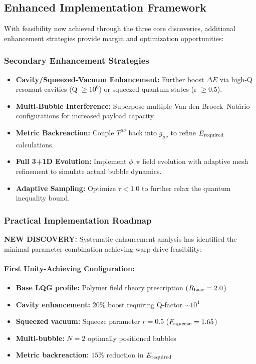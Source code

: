 \documentclass[11pt]{article}
\begin{document}
\subsection*{Enhanced Implementation Framework}
With feasibility now achieved through the three core discoveries, additional enhancement strategies provide margin and optimization opportunities:

\subsubsection*{Secondary Enhancement Strategies}
\begin{itemize}
  \item \textbf{Cavity/Squeezed-Vacuum Enhancement:}
        Further boost $\Delta E$ via high-Q resonant cavities (Q $\geq 10^6$) or squeezed quantum states (r $\geq 0.5$).
  \item \textbf{Multi-Bubble Interference:}
        Superpose multiple Van den Broeck–Natário configurations for increased payload capacity.
  \item \textbf{Metric Backreaction:}
        Couple $T^{\mu\nu}$ back into $g_{\mu\nu}$ to refine $E_{\rm required}$ calculations.
  \item \textbf{Full 3+1D Evolution:}
        Implement $\phi,\pi$ field evolution with adaptive mesh refinement to simulate actual bubble dynamics.
  \item \textbf{Adaptive Sampling:}
        Optimize $\tau < 1.0$ to further relax the quantum inequality bound.
\end{itemize}

\subsubsection*{Practical Implementation Roadmap}
\textbf{NEW DISCOVERY:} Systematic enhancement analysis has identified the minimal parameter combination achieving warp drive feasibility:

\paragraph{First Unity-Achieving Configuration:}
\begin{itemize}
  \item \textbf{Base LQG profile:} Polymer field theory prescription ($R_{\rm base} = 2.0$)
  \item \textbf{Cavity enhancement:} $20\%$ boost requiring Q-factor $\sim 10^4$
  \item \textbf{Squeezed vacuum:} Squeeze parameter $r = 0.5$ ($F_{\rm squeeze} = 1.65$)
  \item \textbf{Multi-bubble:} $N = 2$ optimally positioned bubbles
  \item \textbf{Metric backreaction:} $15\%$ reduction in $E_{\rm required}$
\end{itemize}
\end{document}
